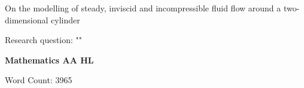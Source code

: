 \begin{titlepage}
	\begin{center}
		\vspace*{2cm}
		\Large On the modelling of steady, inviscid and incompressible fluid flow around a two-dimensional cylinder

		\vspace{1.5cm}
		\normalsize Research question: "\textbf{\researchquestion}"

		\vspace{1.5cm}
		\large\textbf{Mathematics AA HL}

		\vfill
		\color{darkgray} Word Count: 3965
	\end{center}
\end{titlepage}

\tableofcontents\newpage